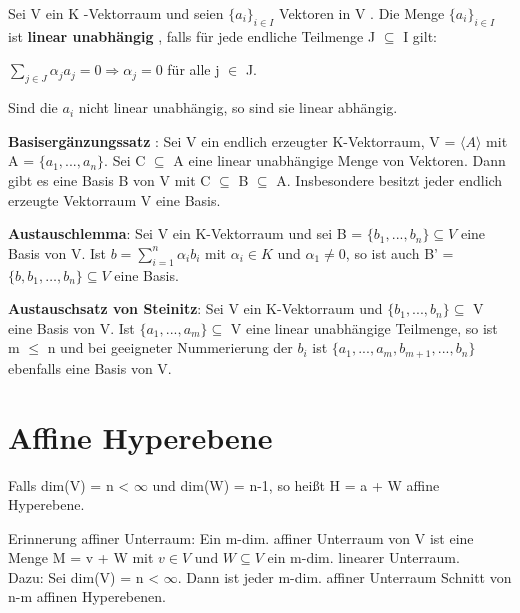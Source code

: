 \begin{definition}
Sei V ein K -Vektorraum und seien $\{a_i \}_{i \in I}$ Vektoren in V . Die Menge $\{a_i\}_{i \in I}$ ist \textbf{linear unabhängig} , falls für jede endliche Teilmenge J $\subseteq$ I gilt:
\begin{center}
$\sum\nolimits_{j \in J} \alpha_j a_j = 0 \Rightarrow \alpha_j = 0$ für alle j $\in$ J.
\end{center}
Sind die $a_i$ nicht linear unabhängig, so sind sie linear abhängig.
\end{definition}

\begin{theorem}
\textbf{Basisergänzungssatz} : Sei V ein endlich erzeugter K-Vektorraum, V = $\langle A \rangle$ mit A = $\{a_1,... ,a_n\}$. Sei C $\subseteq$ A eine linear unabhängige Menge von Vektoren. Dann gibt es eine Basis B von V mit C $\subseteq$ B $\subseteq$ A. Insbesondere besitzt jeder endlich erzeugte Vektorraum V eine Basis.
\end{theorem}

\begin{lemma}
\textbf{Austauschlemma}: Sei V ein K-Vektorraum und sei B = $\{b_1,... ,b_n\} \subseteq V$ eine Basis von V. Ist $b= \sum\nolimits_{i=1}^{n} \alpha_i b_i$ mit $\alpha_i \in K$ und $\alpha_1 \neq 0$, so ist auch B' = $\{ b, b_1, …, b_n \} \subseteq V$ eine Basis.
\end{lemma}

\begin{theorem}
\textbf{Austauschsatz von Steinitz}: Sei V ein K-Vektorraum und $\{b_1,... ,b_n\} \subseteq$ V eine Basis von V. Ist $\{a_1,... ,a_m\} \subseteq$ V eine linear unabhängige Teilmenge, so ist m $\le$ n und bei geeigneter Nummerierung der $b_i$ ist $\{a_1,... ,a_m, b_{m+1},... ,b_n\}$ ebenfalls eine Basis von V.
\end{theorem}

\section{Affine Hyperebene}
\begin{definition}
Falls dim(V) = n < $\infty$ und dim(W) = n-1, so heißt H = a + W affine Hyperebene.
\end{definition}

\begin{remark}
Erinnerung affiner Unterraum: Ein m-dim. affiner Unterraum von V ist eine Menge M = v + W mit  $v \in V$ und $W \subseteq V$ ein m-dim. linearer Unterraum.\\
Dazu: Sei dim(V) = n < $\infty$. Dann ist jeder m-dim. affiner Unterraum Schnitt von n-m affinen Hyperebenen.
\end{remark}

